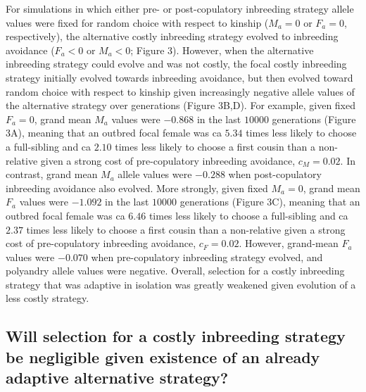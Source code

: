 \documentclass[10pt,letterpaper]{article}
\begin{document}
For simulations in which either pre- or post-copulatory inbreeding strategy allele values were fixed for random choice with respect to kinship ($M_{a}=0$ or $F_{a}=0$, respectively), the alternative costly inbreeding strategy evolved to inbreeding avoidance ($F_{a}<0$ or $M_{a}<0$; Figure 3). However, when the alternative inbreeding strategy could evolve and was not costly, the focal costly inbreeding strategy initially evolved towards inbreeding avoidance, but then evolved toward random choice with respect to kinship given increasingly negative allele values of the alternative strategy over generations (Figure 3B,D). For example, given fixed $F_{a}=0$, grand mean $M_{a}$ values were $-0.868$ in the last $10000$ generations (Figure 3A), meaning that an outbred focal female was ca $5.34$ times less likely to choose a full-sibling and ca $2.10$ times less likely to choose a first cousin than a non-relative given a strong cost of pre-copulatory inbreeding avoidance, $c_{M}=0.02$. In contrast, grand mean $M_{a}$ allele values were $-0.288$ when post-copulatory inbreeding avoidance also evolved. More strongly, given fixed $M_{a}=0$, grand mean $F_{a}$ values were $-1.092$ in the last $10000$ generations (Figure 3C), meaning that an outbred focal female was ca $6.46$ times less likely to choose a full-sibling and ca $2.37$ times less likely to choose a first cousin than a non-relative given a strong cost of pre-copulatory inbreeding avoidance, $c_{F}=0.02$. However, grand-mean $F_{a}$ values were $-0.070$ when pre-copulatory inbreeding strategy evolved, and polyandry allele values were negative. Overall, selection for a costly inbreeding strategy that was adaptive in isolation was greatly weakened given evolution of a less costly strategy.

\subsection*{Will selection for a costly inbreeding strategy be negligible given existence of an already adaptive alternative strategy?}
\end{document}
